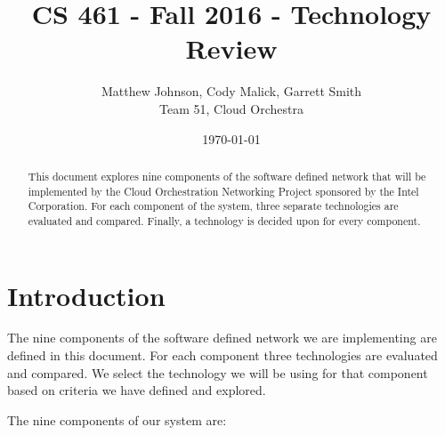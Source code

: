 \documentclass[10pt,letterpaper,onecolumn,journal]{IEEEtran}
\begin{document}
\begin{titlepage}
	\title{CS 461 - Fall 2016 - Technology Review}
	\author{Matthew Johnson, Cody Malick, Garrett Smith\\
		Team 51, Cloud Orchestra}
	\date{\today}
	\maketitle
	\vspace{4cm}
	\begin{abstract}
		\noindent This document explores nine components of the software
		defined network that will be implemented by the Cloud
		Orchestration Networking Project sponsored by the Intel
		Corporation. For each component of the system, three separate
		technologies are evaluated and compared. Finally, a technology
		is decided upon for every component.
	\end{abstract}

\end{titlepage}
\tableofcontents
\clearpage

\section{Introduction}

The nine components of the software defined network we are implementing are
defined in this document. For each component three technologies are evaluated
and compared. We select the technology we will be using for that component
based on criteria we have defined and explored.

The nine components of our system are:
\end{document}
